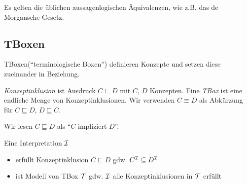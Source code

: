 Es gelten die üblichen aussagenlogischen Äquivalenzen, wie z.B. das de
Morgansche Gesetz.

\subsection{TBoxen}\label{tboxen}
\label{sec:tbox}

TBoxen(\enquote{terminologische Boxen}) definieren Konzepte und setzen diese zueinander in Beziehung.

\begin{definition}
\emph{Konzeptinklusion} ist Ausdruck $C \sqsubseteq D$ mit $C$, $D$ Konzepten.
Eine \emph{TBox} ist eine endliche Menge von Konzeptinklusionen.  Wir
verwenden $C \equiv D$ als Abkürzung für $C \sqsubseteq D$, $D \sqsubseteq C$.
\end{definition}
Wir lesen $C \sqsubseteq D$ als \enquote{$C$ impliziert $D$}.

\begin{definition} 
Eine Interpretation $\mathcal{I}$
\begin{itemize}
\item
  erfüllt Konzeptinklusion $C \sqsubseteq D$ gdw.
  $C^{\mathcal{I}} \subseteq D^{\mathcal{I}}$
\item
  ist Modell von TBox $\mathcal{T}$ gdw. $\mathcal{I}$ alle Konzeptinklusionen in $\mathcal{T}$
  erfüllt
\end{itemize}
\end{definition}

